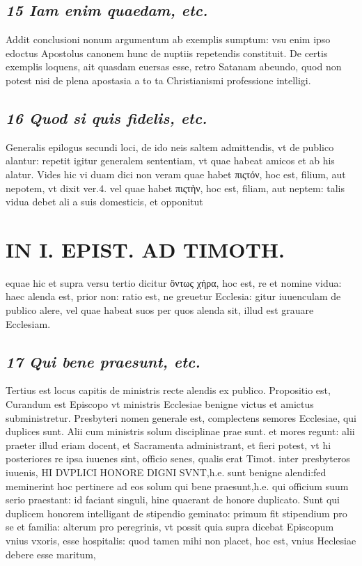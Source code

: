 \documentclass{article}
\begin{document}
\begin{pages}
\subsection*{\textit{15 Iam enim quaedam, etc. }}\pstart Addit conclusioni nonum argumentum ab exemplis sumptum: vsu enim ipso edoctus Apostolus canonem hunc de nuptiis repetendis constituit. De certis exemplis loquens, ait quasdam euersas esse, retro Satanam abeundo, quod non potest nisi de plena apostasia a to ta Christianismi professione intelligi.  \pend
{}
{}
\subsection*{\textit{16 Quod si quis fidelis, etc. }}\pstart Generalis epilogus secundi loci, de ido neis saltem admittendis, vt de publico alantur: repetit igitur generalem sententiam, vt quae habeat amicos et ab his alatur. Vides hic vi duam dici non veram quae habet πιςτόν, hoc est, filium, aut nepotem, vt dixit ver.4. vel quae habet πιςτὴν, hoc est, filiam, aut neptem: talis vidua debet ali a suis domesticis, et opponitut  \pend
\section*{IN I. EPIST. AD TIMOTH. }
\marginpar{[ p.131 ]}\pstart equae hic et supra versu tertio dicitur ὄντως χήρα, hoc est, re et nomine vidua: haec alenda est, prior non: ratio est, ne greuetur Ecclesia: gitur iuuenculam de publico alere, vel quae habeat suos per quos alenda sit, illud est grauare Ecclesiam.  \pend
{}
{}
\subsection*{\textit{17 Qui bene praesunt, etc. }}\pstart Tertius est locus capitis de ministris recte alendis ex publico. Propositio est, Curandum est Episcopo vt ministris Ecclesiae benigne victus et amictus subministretur. Presbyteri nomen generale est, complectens semores Ecclesiae, qui duplices sunt.  \pend\pstart Alii cum ministris solum disciplinae prae sunt. et mores regunt: alii praeter illud eriam docent, et Sacramenta administrant, et fieri potest, vt hi posteriores re ipsa iuuenes sint, officio senes, qualis erat Timot. inter presbyteros iuuenis, HI DVPLICI HONORE DIGNI SVNT,h.e. sunt benigne alendi:fed meminerint hoc pertinere ad eos solum qui bene praesunt,h.e. qui officium suum serio praestant: id faciant singuli, hine quaerant de honore duplicato.  \pend\pstart Sunt qui duplicem honorem intelligant de stipendio geminato: primum fit stipendium pro se et familia: alterum pro peregrinis, vt possit quia supra dicebat Episcopum vnius vxoris, esse hospitalis: quod tamen mihi non placet, hoc est, vnius Heclesiae debere esse maritum,  \pend

\end{pages}
\end{document}
